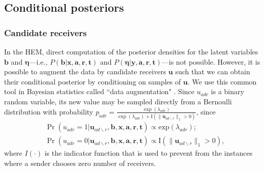 \documentclass[ba]{imsart}
\numberwithin{equation}{section}
\theoremstyle{plain}
\begin{document}
	\subsection{Conditional posteriors}\label{subsec:conditionaldist}
	\subsubsection{Candidate receivers}
	In the HEM, direct computation of the posterior densities for the latent variables $\boldsymbol{b}$ and $\boldsymbol{\eta}$---i.e., $P(\boldsymbol{b}|\boldsymbol{x},\boldsymbol{a}, \boldsymbol{r},\boldsymbol{t})$ and $P(\boldsymbol{\eta}|\boldsymbol{y},\boldsymbol{a}, \boldsymbol{r},\boldsymbol{t})$---is not possible. However, it is possible to augment the data by candidate receivers $\boldsymbol{u}$ such that we can obtain their conditional posterior by conditioning on samples of $\boldsymbol{u}$. %
	We use this common tool in Bayesian statistics called ``data augmentation" \citep{tanner1987calculation,neal2015exact}. Since $u_{adr}$ is a binary random variable, its new value may be sampled directly from a Bernoulli distribution with probability $p_{adr} =\frac{\exp(\lambda_{adr})}{\exp(\lambda_{adr})+\text{I}(\lVert\boldsymbol{u}_{ad\backslash r}\rVert_1 > 0 )}$, since
	\begin{equation}
		\begin{aligned}
			&\Pr(u_{adr}=1| \boldsymbol{u}_{ad\backslash r}, \boldsymbol{b}, \boldsymbol{x},\boldsymbol{a}, \boldsymbol{r},\boldsymbol{t})
			\propto \mbox{exp}(\lambda_{adr});\\
			&\Pr(u_{adr}=0| \boldsymbol{u}_{ad\backslash r},\boldsymbol{b}, \boldsymbol{x},\boldsymbol{a}, \boldsymbol{r},\boldsymbol{t})\propto \text{I}(\lVert\boldsymbol{u}_{ad\backslash r}\rVert_1 > 0 ),
		\end{aligned}
		\label{eqn:latentreceiver}
	\end{equation}
	where $I(\cdot)$ is the indicator function that is used to prevent from the instances where a sender chooses zero number of receivers. 
\end{document}

